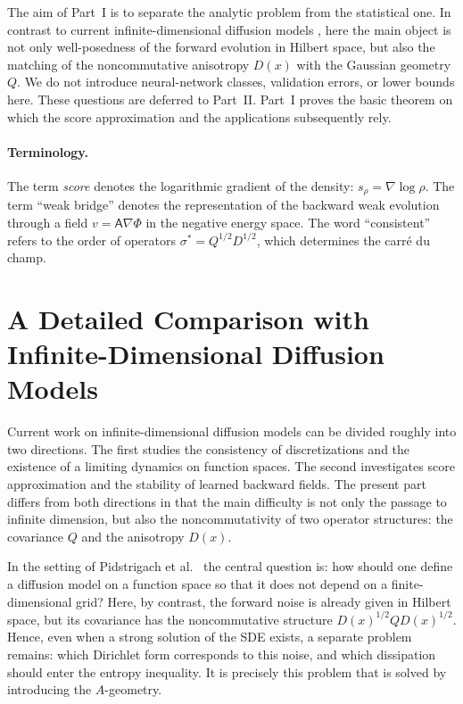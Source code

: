 \documentclass{article}
\newcommand{\Asf}{\mathsf A}
\begin{document}
The aim of Part~I is to separate the analytic problem from the statistical
one. In contrast to current infinite-dimensional diffusion models
\cite{LimYoon2023,Pidstrigach2024,FranzeseMichiardi2025}, here the main object
is not only well-posedness of the forward evolution in Hilbert space, but also
the matching of the noncommutative anisotropy \(D(x)\) with the Gaussian
geometry \(Q\). We do not introduce neural-network classes, validation errors,
or lower bounds here. These questions are deferred to Part~II. Part~I
proves the basic theorem on which the score approximation and the applications
subsequently rely.

\paragraph{Terminology.}
The term \emph{score} denotes the logarithmic gradient of the density:
\(s_\rho=\nabla\log\rho\). The term ``weak bridge'' denotes the representation
of the backward weak evolution through a field \(v=\Asf\nabla\Phi\) in the
negative energy space. The word ``consistent'' refers to the order of
operators \(\sigma^*=Q^{1/2}D^{1/2}\), which determines the carr\'e du champ.


\section{A Detailed Comparison with Infinite-Dimensional Diffusion Models}
\label{sec:comparison-functional-diffusions}

Current work on infinite-dimensional diffusion models can be divided roughly
into two directions. The first studies the consistency of discretizations and
the existence of a limiting dynamics on function spaces. The second
investigates score approximation and the stability of learned backward fields.
The present part differs from both directions in that the main difficulty is
not only the passage to infinite dimension, but also the noncommutativity of
two operator structures: the covariance \(Q\) and the anisotropy \(D(x)\).

In the setting of Pidstrigach et al.\ \cite{Pidstrigach2024} the central
question is: how should one define a diffusion model on a function space so
that it does not depend on a finite-dimensional grid? Here, by contrast, the
forward noise is already given in Hilbert space, but its covariance has the
noncommutative structure \(D(x)^{1/2}QD(x)^{1/2}\). Hence, even when a strong
solution of the SDE exists, a separate problem remains: which Dirichlet form
corresponds to this noise, and which dissipation should enter the entropy
inequality. It is precisely this problem that is solved by introducing the
\(A\)-geometry.
\end{document}
